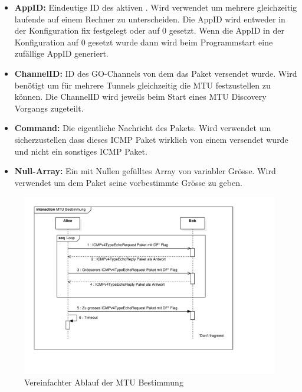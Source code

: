 \begin{itemize}
  \item \textbf{AppID:} Eindeutige ID des aktiven \tool{}. Wird verwendet um mehrere gleichzeitig laufende \tool{} auf einem Rechner zu unterscheiden. Die AppID wird entweder in der Konfiguration fix festgelegt oder auf 0 gesetzt. Wenn die AppID in der Konfiguration auf 0 gesetzt wurde dann wird beim Programmstart eine zufällige AppID generiert.
  \item \textbf{ChannelID:} ID des GO-Channels von dem das Paket versendet wurde. Wird benötigt um für mehrere Tunnels gleichzeitig die \acs{MTU} festzustellen zu können. Die ChannelID wird jeweils beim Start eines \acs{MTU} Discovery Vorgangs zugeteilt.
  \item \textbf{Command:} Die eigentliche Nachricht des Pakets. Wird verwendet um sicherzustellen dass dieses \acs{ICMP} Paket wirklich von einem \tool{} versendet wurde und nicht ein sonstiges \acs{ICMP} Paket.
  \item \textbf{Null-Array:} Ein mit Nullen gefülltes Array von variabler Grösse. Wird verwendet um dem Paket seine vorbestimmte Grösse zu geben.
\end{itemize}

\begin{figure}[H]
    \begin{center}
        \includegraphics[trim=30 80 140 20,clip,width=\textwidth]{mainpart/implementation/img/MTUBestimmungErfolgreich}
    \end{center}
    \caption{Vereinfachter Ablauf der MTU Bestimmung}
\end{figure}

